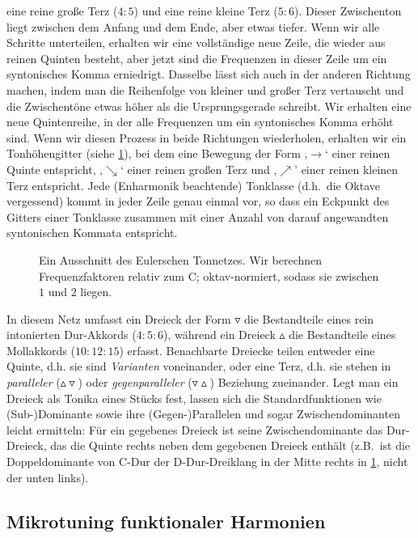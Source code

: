\documentclass[british,11pt]{scrartcl}
\begin{document}
eine reine große Terz ($4:5$) und eine reine kleine Terz ($5:6$). Dieser
Zwischenton liegt zwischen dem Anfang und dem Ende, aber etwas tiefer. Wenn wir
alle Schritte unterteilen, erhalten wir eine vollständige neue Zeile, die wieder
aus reinen Quinten besteht, aber jetzt sind die Frequenzen in dieser Zeile um
ein syntonisches Komma erniedrigt. Dasselbe lässt sich auch in der anderen
Richtung machen, indem man die Reihenfolge von kleiner und großer Terz
vertauscht und die Zwischentöne etwas höher als die Ursprungsgerade schreibt.
Wir erhalten eine neue Quintenreihe, in der alle Frequenzen um ein syntonisches
Komma erhöht sind. Wenn wir diesen Prozess in beide Richtungen wiederholen,
erhalten wir ein Tonhöhengitter (siehe \cref{fig:latticeExcerpt}), bei dem eine
Bewegung der Form ‚$\to$‘ einer reinen Quinte entspricht, ‚$\searrow$‘ einer
reinen großen Terz und ‚$\nearrow$’ einer reinen kleinen Terz entspricht. Jede
(Enharmonik beachtende) Tonklasse (d.h.\ die Oktave vergessend) kommt in jeder
Zeile genau einmal vor, so dass ein Eckpunkt des Gitters einer Tonklasse
zusammen mit einer Anzahl von darauf angewandten syntonischen Kommata
entspricht.

\begin{figure}[h]
  
  \caption{Ein Ausschnitt des Eulerschen Tonnetzes. Wir berechnen
  	Frequenzfaktoren relativ zum C; oktav-normiert, sodass sie zwischen $1$
  	und $2$ liegen.}\label{fig:latticeExcerpt}
\end{figure}

In diesem Netz umfasst ein Dreieck der Form $\triangledown$ die Bestandteile 
eines rein intonierten Dur-Akkords ($4:5:6$), während ein Dreieck $\vartriangle$
die Bestandteile eines Mollakkords ($10:12:15$) erfasst. Benachbarte Dreiecke
teilen entweder eine Quinte, d.h. sie sind \emph{Varianten} voneinander, oder
eine Terz, d.h. sie stehen in \emph{paralleler}
($\vartriangle\!\!\!\triangledown$) oder \emph{gegenparalleler}
($\triangledown\!\!\!\vartriangle$) Beziehung zueinander. Legt man ein Dreieck
als Tonika eines Stücks fest, lassen sich die Standardfunktionen wie
(Sub-)Dominante sowie ihre (Gegen-)Parallelen und sogar Zwischendominanten
leicht ermitteln: Für ein gegebenes Dreieck ist seine Zwischendominante das
Dur-Dreieck, das die Quinte rechts neben dem gegebenen Dreieck enthält (z.B.\
ist die Doppeldominante von C-Dur der D-Dur-Dreiklang in der Mitte rechts in
\cref{fig:latticeExcerpt}, nicht der unten links).

\subsection{Mikrotuning funktionaler Harmonien}
\end{document}
